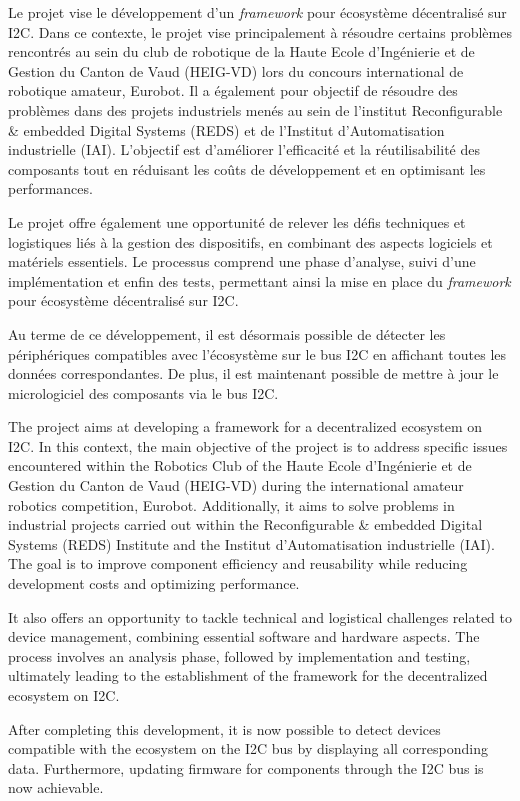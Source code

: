 Le projet vise le développement d'un \textit{framework} pour écosystème décentralisé sur I2C.
Dans ce contexte, le projet vise principalement à résoudre certains problèmes rencontrés au sein du club de robotique de la Haute Ecole d'Ingénierie et de Gestion du Canton de Vaud (HEIG-VD) lors du concours international de robotique amateur, Eurobot.
Il a également pour objectif de résoudre des problèmes dans des projets industriels menés au sein de l'institut Reconfigurable \& embedded Digital Systems (REDS) et de l'Institut d'Automatisation industrielle (IAI).
L'objectif est d'améliorer l'efficacité et la réutilisabilité des composants tout en réduisant les coûts de développement et en optimisant les performances.

Le projet offre également une opportunité de relever les défis techniques et logistiques liés à la gestion des dispositifs, en combinant des aspects logiciels et matériels essentiels.
Le processus comprend une phase d'analyse, suivi d'une implémentation et enfin des tests, permettant ainsi la mise en place du \textit{framework} pour écosystème décentralisé sur I2C.

Au terme de ce développement, il est désormais possible de détecter les périphériques compatibles avec l'écosystème sur le bus I2C en affichant toutes les données correspondantes.
De plus, il est maintenant possible de mettre à jour le micrologiciel des composants via le bus I2C.

\asterism

The project aims at developing a framework for a decentralized ecosystem on I2C.
In this context, the main objective of the project is to address specific issues encountered within the Robotics Club of the Haute Ecole d’Ingénierie et de Gestion du Canton de Vaud (HEIG-VD) during the international amateur robotics competition, Eurobot.
Additionally, it aims to solve problems in industrial projects carried out within the Reconfigurable \& embedded Digital Systems (REDS) Institute and the Institut d'Automatisation industrielle (IAI).
The goal is to improve component efficiency and reusability while reducing development costs and optimizing performance.

It also offers an opportunity to tackle technical and logistical challenges related to device management, combining essential software and hardware aspects.
The process involves an analysis phase, followed by implementation and testing, ultimately leading to the establishment of the framework for the decentralized ecosystem on I2C.

After completing this development, it is now possible to detect devices compatible with the ecosystem on the I2C bus by displaying all corresponding data.
Furthermore, updating firmware for components through the I2C bus is now achievable.